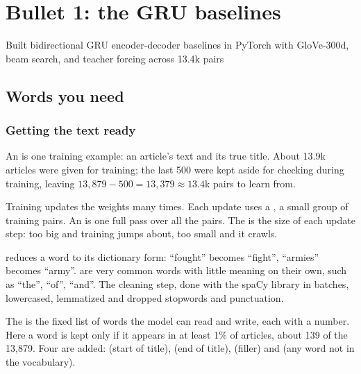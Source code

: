 \chapter{Bullet 1: the GRU baselines}
\label{ch:gru}

\begin{cvline}
Built bidirectional GRU encoder-decoder baselines in PyTorch with GloVe-300d, beam search, and teacher forcing across 13.4k pairs
\end{cvline}

\section{Words you need}

\subsection*{Getting the text ready}

\begin{definition}
An  is one training example: an article's text and its true title. About 13.9k articles were given for training; the last 500 were kept aside for checking during training, leaving $13{,}879 - 500 = 13{,}379 \approx 13.4$k pairs to learn from.
\end{definition}

\begin{definition}
Training updates the weights many times. Each update uses a , a small group of training pairs. An  is one full pass over all the pairs. The  is the size of each update step: too big and training jumps about, too small and it crawls.
\end{definition}

\begin{definition}
 reduces a word to its dictionary form: ``fought'' becomes ``fight'', ``armies'' becomes ``army''.  are very common words with little meaning on their own, such as ``the'', ``of'', ``and''. The cleaning step, done with the spaCy library in batches, lowercased, lemmatized and dropped stopwords and punctuation.
\end{definition}

\begin{definition}
The  is the fixed list of words the model can read and write, each with a number. Here a word is kept only if it appears in at least 1\% of articles, about 139 of the 13,879. Four  are added:  (start of title),  (end of title),  (filler) and  (any word not in the vocabulary).
\end{definition}

